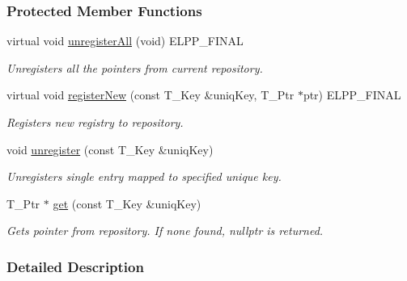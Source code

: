 \subsubsection*{Protected Member Functions}
\begin{DoxyCompactItemize}
\item 
\hypertarget{a00073_ac40e62ddf5017beb91c28b472c9628c2}{}virtual void \hyperlink{a00073_ac40e62ddf5017beb91c28b472c9628c2}{unregister\+All} (void) E\+L\+P\+P\+\_\+\+F\+I\+N\+A\+L\label{a00073_ac40e62ddf5017beb91c28b472c9628c2}

\begin{DoxyCompactList}\small\item\em Unregisters all the pointers from current repository. \end{DoxyCompactList}\item 
\hypertarget{a00073_ab10b3dd25ff0df036e7a015635a15dee}{}virtual void \hyperlink{a00073_ab10b3dd25ff0df036e7a015635a15dee}{register\+New} (const T\+\_\+\+Key \&uniq\+Key, T\+\_\+\+Ptr $\ast$ptr) E\+L\+P\+P\+\_\+\+F\+I\+N\+A\+L\label{a00073_ab10b3dd25ff0df036e7a015635a15dee}

\begin{DoxyCompactList}\small\item\em Registers new registry to repository. \end{DoxyCompactList}\item 
\hypertarget{a00073_aab6f0ce3a99feff11add0bd8b869fcb8}{}void \hyperlink{a00073_aab6f0ce3a99feff11add0bd8b869fcb8}{unregister} (const T\+\_\+\+Key \&uniq\+Key)\label{a00073_aab6f0ce3a99feff11add0bd8b869fcb8}

\begin{DoxyCompactList}\small\item\em Unregisters single entry mapped to specified unique key. \end{DoxyCompactList}\item 
\hypertarget{a00073_a18c332267f2acbe78c97a611dec2e5c2}{}T\+\_\+\+Ptr $\ast$ \hyperlink{a00073_a18c332267f2acbe78c97a611dec2e5c2}{get} (const T\+\_\+\+Key \&uniq\+Key)\label{a00073_a18c332267f2acbe78c97a611dec2e5c2}

\begin{DoxyCompactList}\small\item\em Gets pointer from repository. If none found, nullptr is returned. \end{DoxyCompactList}\end{DoxyCompactItemize}


\subsubsection{Detailed Description}
